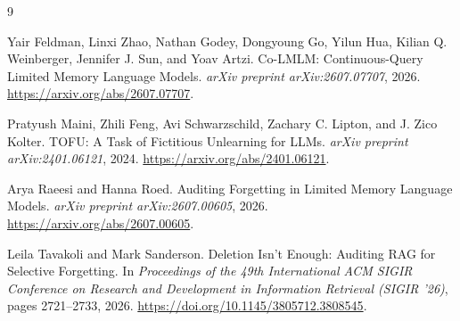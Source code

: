 \documentclass[11pt]{article}
\begin{document}
\begin{thebibliography}{9}

Yair Feldman, Linxi Zhao, Nathan Godey, Dongyoung Go, Yilun Hua,
Kilian Q. Weinberger, Jennifer J. Sun, and Yoav Artzi.
\newblock Co-LMLM: Continuous-Query Limited Memory Language Models.
\newblock \emph{arXiv preprint arXiv:2607.07707}, 2026.
\newblock \url{https://arxiv.org/abs/2607.07707}.

Pratyush Maini, Zhili Feng, Avi Schwarzschild, Zachary C. Lipton, and
J. Zico Kolter.
\newblock TOFU: A Task of Fictitious Unlearning for LLMs.
\newblock \emph{arXiv preprint arXiv:2401.06121}, 2024.
\newblock \url{https://arxiv.org/abs/2401.06121}.

Arya Raeesi and Hanna Roed.
\newblock Auditing Forgetting in Limited Memory Language Models.
\newblock \emph{arXiv preprint arXiv:2607.00605}, 2026.
\newblock \url{https://arxiv.org/abs/2607.00605}.

Leila Tavakoli and Mark Sanderson.
\newblock Deletion Isn't Enough: Auditing RAG for Selective Forgetting.
\newblock In \emph{Proceedings of the 49th International ACM SIGIR Conference
on Research and Development in Information Retrieval (SIGIR '26)},
pages 2721--2733, 2026.
\newblock \url{https://doi.org/10.1145/3805712.3808545}.

\end{thebibliography}
\end{document}
